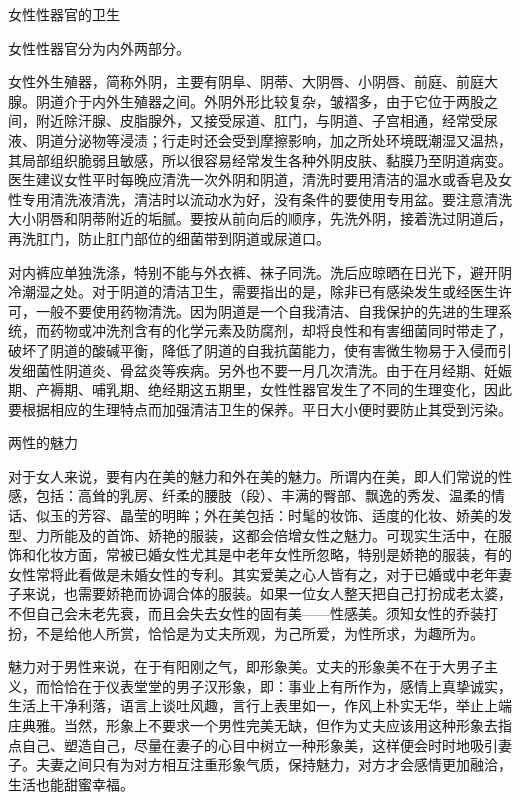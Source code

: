 \documentclass[12pt,UTF8,openany]{ctexbook}
\begin{document}
女性性器官的卫生


女性性器官分为内外两部分。

女性外生殖器，简称外阴，主要有阴阜、阴蒂、大阴唇、小阴唇、前庭、前庭大腺。阴道介于内外生殖器之间。外阴外形比较复杂，皱褶多，由于它位于两股之间，附近除汗腺、皮脂腺外，又接受尿道、肛门，与阴道、子宫相通，经常受尿液、阴道分泌物等浸渍；行走时还会受到摩擦影响，加之所处环境既潮湿又温热，其局部组织脆弱且敏感，所以很容易经常发生各种外阴皮肤、黏膜乃至阴道病变。医生建议女性平时每晚应清洗一次外阴和阴道，清洗时要用清洁的温水或香皂及女性专用清洗液清洗，清洁时以流动水为好，没有条件的要使用专用盆。要注意清洗大小阴唇和阴蒂附近的垢腻。要按从前向后的顺序，先洗外阴，接着洗过阴道后，再洗肛门，防止肛门部位的细菌带到阴道或尿道口。

对内裤应单独洗涤，特别不能与外衣裤、袜子同洗。洗后应晾晒在日光下，避开阴冷潮湿之处。对于阴道的清洁卫生，需要指出的是，除非已有感染发生或经医生许可，一般不要使用药物清洗。因为阴道是一个自我清洁、自我保护的先进的生理系统，而药物或冲洗剂含有的化学元素及防腐剂，却将良性和有害细菌同时带走了，破坏了阴道的酸碱平衡，降低了阴道的自我抗菌能力，使有害微生物易于入侵而引发细菌性阴道炎、骨盆炎等疾病。另外也不要一月几次清洗。由于在月经期、妊娠期、产褥期、哺乳期、绝经期这五期里，女性性器官发生了不同的生理变化，因此要根据相应的生理特点而加强清洁卫生的保养。平日大小便时要防止其受到污染。





两性的魅力


对于女人来说，要有内在美的魅力和外在美的魅力。所谓内在美，即人们常说的性感，包括：高耸的乳房、纤柔的腰肢（段）、丰满的臀部、飘逸的秀发、温柔的情话、似玉的芳容、晶莹的明眸；外在美包括：时髦的妆饰、适度的化妆、娇美的发型、力所能及的首饰、娇艳的服装，这都会倍增女性之魅力。可现实生活中，在服饰和化妆方面，常被已婚女性尤其是中老年女性所忽略，特别是娇艳的服装，有的女性常将此看做是未婚女性的专利。其实爱美之心人皆有之，对于已婚或中老年妻子来说，也需要娇艳而协调合体的服装。如果一位女人整天把自己打扮成老太婆，不但自己会未老先衰，而且会失去女性的固有美——性感美。须知女性的乔装打扮，不是给他人所赏，恰恰是为丈夫所观，为己所爱，为性所求，为趣所为。

魅力对于男性来说，在于有阳刚之气，即形象美。丈夫的形象美不在于大男子主义，而恰恰在于仪表堂堂的男子汉形象，即：事业上有所作为，感情上真挚诚实，生活上干净利落，语言上谈吐风趣，言行上表里如一，作风上朴实无华，举止上端庄典雅。当然，形象上不要求一个男性完美无缺，但作为丈夫应该用这种形象去指点自己、塑造自己，尽量在妻子的心目中树立一种形象美，这样便会时时地吸引妻子。夫妻之间只有为对方相互注重形象气质，保持魅力，对方才会感情更加融洽，生活也能甜蜜幸福。
\end{document}

